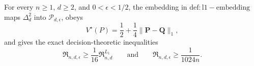 For every \(n\ge1\), \(d\ge2\), and \(0<\epsilon<1/2\), the embedding in \(\mathrm{def:l1-embedding}\) maps \(\Delta_d^2\) into \(\mathcal P_{d,\epsilon}\), obeys
\[
 V^\star(P)=\frac12+\frac14\lVert\mathbf P-\mathbf Q\rVert_1,
\]
and gives the exact decision-theoretic inequalities
\[
 \mathfrak R_{n,d,\epsilon}\ge\frac1{16}\mathfrak R^{L_1}_{n,d}
 \qquad\text{and}\qquad
 \mathfrak R_{n,d,\epsilon}\ge\frac{1}{1024n}.
\]